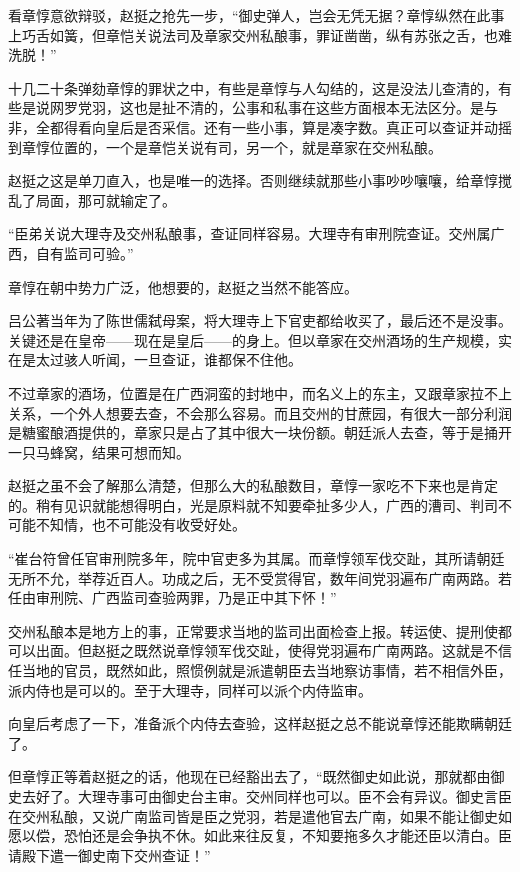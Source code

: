 看章惇意欲辩驳，赵挺之抢先一步，“御史弹人，岂会无凭无据？章惇纵然在此事上巧舌如簧，但章恺关说法司及章家交州私酿事，罪证凿凿，纵有苏张之舌，也难洗脱！”

十几二十条弹劾章惇的罪状之中，有些是章惇与人勾结的，这是没法儿查清的，有些是说网罗党羽，这也是扯不清的，公事和私事在这些方面根本无法区分。是与非，全都得看向皇后是否采信。还有一些小事，算是凑字数。真正可以查证并动摇到章惇位置的，一个是章恺关说有司，另一个，就是章家在交州私酿。

赵挺之这是单刀直入，也是唯一的选择。否则继续就那些小事吵吵嚷嚷，给章惇搅乱了局面，那可就输定了。

“臣弟关说大理寺及交州私酿事，查证同样容易。大理寺有审刑院查证。交州属广西，自有监司可验。”

章惇在朝中势力广泛，他想要的，赵挺之当然不能答应。

吕公著当年为了陈世儒弑母案，将大理寺上下官吏都给收买了，最后还不是没事。关键还是在皇帝——现在是皇后——的身上。但以章家在交州酒场的生产规模，实在是太过骇人听闻，一旦查证，谁都保不住他。

不过章家的酒场，位置是在广西洞蛮的封地中，而名义上的东主，又跟章家拉不上关系，一个外人想要去查，不会那么容易。而且交州的甘蔗园，有很大一部分利润是糖蜜酿酒提供的，章家只是占了其中很大一块份额。朝廷派人去查，等于是捅开一只马蜂窝，结果可想而知。

赵挺之虽不会了解那么清楚，但那么大的私酿数目，章惇一家吃不下来也是肯定的。稍有见识就能想得明白，光是原料就不知要牵扯多少人，广西的漕司、判司不可能不知情，也不可能没有收受好处。

“崔台符曾任官审刑院多年，院中官吏多为其属。而章惇领军伐交趾，其所请朝廷无所不允，举荐近百人。功成之后，无不受赏得官，数年间党羽遍布广南两路。若任由审刑院、广西监司查验两罪，乃是正中其下怀！”

交州私酿本是地方上的事，正常要求当地的监司出面检查上报。转运使、提刑使都可以出面。但赵挺之既然说章惇领军伐交趾，使得党羽遍布广南两路。这就是不信任当地的官员，既然如此，照惯例就是派遣朝臣去当地察访事情，若不相信外臣，派内侍也是可以的。至于大理寺，同样可以派个内侍监审。

向皇后考虑了一下，准备派个内侍去查验，这样赵挺之总不能说章惇还能欺瞒朝廷了。

但章惇正等着赵挺之的话，他现在已经豁出去了，“既然御史如此说，那就都由御史去好了。大理寺事可由御史台主审。交州同样也可以。臣不会有异议。御史言臣在交州私酿，又说广南监司皆是臣之党羽，若是遣他官去广南，如果不能让御史如愿以偿，恐怕还是会争执不休。如此来往反复，不知要拖多久才能还臣以清白。臣请殿下遣一御史南下交州查证！”


